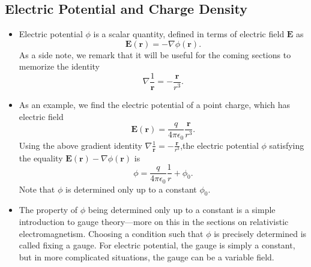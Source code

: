 \documentclass[11pt, a4paper]{article}
\renewcommand{\vec}[1]{\bm{#1}} %
\renewcommand{\r}{\vec{r}}
\newcommand{\E}{\vec{E}} %
\newcommand{\ee}{\epsilon_{0}}  %
\renewcommand{\grad}{\nabla}
\begin{document}
\subsection{Electric Potential and Charge Density}
\begin{itemize}
	\item Electric potential $ \phi $ is a scalar quantity, defined in terms of electric field $ \E $ as
	\begin{equation*}
		\E(\r) = - \grad \phi(\r).
	\end{equation*}
	As a side note, we remark that it will be useful for the coming sections to memorize the identity
	\begin{equation*}
		\grad \frac{1}{\r} = - \frac{\r}{r^{3}}.
	\end{equation*}
	
	\item As an example, we find the electric potential of a point charge, which has electric field
	\begin{equation*}
		\E(\r) = \frac{q}{4\pi \ee} \frac{\r}{r^{3}}.
	\end{equation*}
	Using the above gradient identity $ \grad \frac{1}{\r} = - \frac{\r}{r^{3}} $,the electric potential $ \phi $  satisfying the equality $ \E(\r)  -\grad \phi(\r) $ is
	\begin{equation*}
		\phi = \frac{q}{4\pi \ee}\frac{1}{r} + \phi_{0}.
	\end{equation*}
	Note that $ \phi $ is determined only up to a constant $ \phi_{0} $.
	
	\item The property of $ \phi $ being determined only up to a constant is a simple introduction to gauge theory---more on this in the sections on relativistic electromagnetism. Choosing a condition such that $ \phi $ is precisely determined is called fixing a gauge. For electric potential, the gauge is simply a constant, but in more complicated situations, the gauge can be a variable field.
	
\end{itemize}
\end{document}
